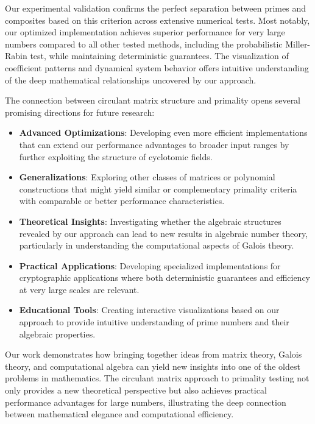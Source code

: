 Our experimental validation confirms the perfect separation between primes and composites based on this criterion across extensive numerical tests. Most notably, our optimized implementation achieves superior performance for very large numbers compared to all other tested methods, including the probabilistic Miller-Rabin test, while maintaining deterministic guarantees. The visualization of coefficient patterns and dynamical system behavior offers intuitive understanding of the deep mathematical relationships uncovered by our approach.

The connection between circulant matrix structure and primality opens several promising directions for future research:

\begin{itemize}
    \item \textbf{Advanced Optimizations}: Developing even more efficient implementations that can extend our performance advantages to broader input ranges by further exploiting the structure of cyclotomic fields.
    
    \item \textbf{Generalizations}: Exploring other classes of matrices or polynomial constructions that might yield similar or complementary primality criteria with comparable or better performance characteristics.
    
    \item \textbf{Theoretical Insights}: Investigating whether the algebraic structures revealed by our approach can lead to new results in algebraic number theory, particularly in understanding the computational aspects of Galois theory.
    
    \item \textbf{Practical Applications}: Developing specialized implementations for cryptographic applications where both deterministic guarantees and efficiency at very large scales are relevant.
    
    \item \textbf{Educational Tools}: Creating interactive visualizations based on our approach to provide intuitive understanding of prime numbers and their algebraic properties.
\end{itemize}

Our work demonstrates how bringing together ideas from matrix theory, Galois theory, and computational algebra can yield new insights into one of the oldest problems in mathematics. The circulant matrix approach to primality testing not only provides a new theoretical perspective but also achieves practical performance advantages for large numbers, illustrating the deep connection between mathematical elegance and computational efficiency.

